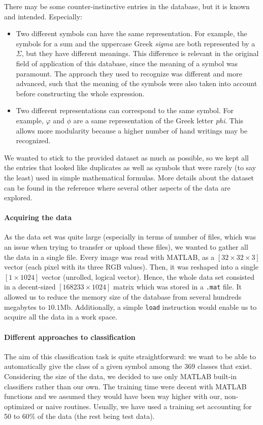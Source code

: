 \documentclass[twocolumn]{article}%
\begin{document}
	There may be some counter-instinctive entries in the database, but it is known and intended. Especially:
	\begin{itemize}
	\item Two different symbols can have the same representation. For example, the symbols for a sum and the uppercase Greek \textit{sigma} are both represented by a $\Sigma$, but they have different meanings. This difference is relevant in the original field of application of this database, since the meaning of a symbol was paramount. The approach they used to recognize was different and more advanced, such that the meaning of the symbols were also taken into account before constructing the whole expression.
	\item Two different representations can correspond to the same symbol. For example,  $\varphi$ and $\phi$ are a same representation of the Greek letter \textit{phi}. This allows more modularity because a higher number of hand writings may be recognized.
	\end{itemize}
	We wanted to stick to the provided dataset as much as possible, so we kept all the entries that looked like duplicates as well as symbols that were rarely (to say the least) used in simple mathematical formulas. More details about the dataset can be found in the reference \cite{hasyv2} where several other aspects of the data are explored.
	
	\paragraph{Acquiring the data}
	As the data set was quite large (especially in terms of number of files, which was an issue when trying to transfer or upload these files), we wanted to gather all the data in a single file. Every image was read with MATLAB, as a $[32\times32\times 3]$ vector (each pixel with its three RGB values). Then, it was reshaped into a single $[1\times1024]$ vector (unrolled, logical vector). Hence, the whole data set consisted in a decent-sized $[168233 \times 1024]$ matrix which was stored in a \texttt{.mat} file. It allowed us to reduce the memory size of the database from several hundreds megabytes to $10.1$Mb. Additionally, a simple \texttt{load} instruction would enable us to acquire all the data in a work space.
	
	
	\paragraph{Different approaches to classification}
	The aim of this classification task is quite straightforward: we want to be able to automatically give the class of a given symbol among the 369 classes that exist. Considering the size of the data, we decided to use only MATLAB built-in classifiers rather than our own. The training time were decent with MATLAB functions and we assumed they would have been way higher with our, non-optimized or naive routines. Usually, we have used a training set accounting for 50 to 60\% of the data (the rest being test data).
	
\end{document}
